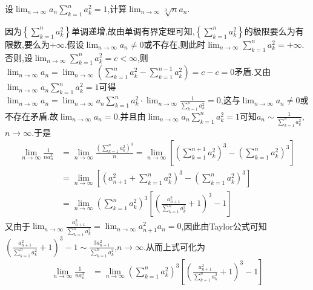 \documentclass[lang=cn,newtx,10pt,scheme=chinese]{elegantbook}
\begin{document}
\begin{example}
设\(\lim_{n \to \infty} a_n \sum\limits_{k = 1}^{n} a_{k}^{2} = 1\),计算\(\lim_{n \to \infty} \sqrt[3]{n}a_n\).
\end{example}
\begin{solution}
因为\(\left\{\sum\limits_{k = 1}^n{a_{k}^{2}}\right\}\)单调递增,故由单调有界定理可知,\(\left\{\sum\limits_{k = 1}^n{a_{k}^{2}}\right\}\)的极限要么为有限数,要么为\(+\infty\).假设\(\lim_{n\rightarrow\infty}a_n\neq 0\)或不存在,则此时\(\lim_{n\rightarrow\infty}\sum\limits_{k = 1}^n{a_{k}^{2}}=+\infty\).否则,设\(\lim_{n\rightarrow\infty}\sum\limits_{k = 1}^n{a_{k}^{2}}=c <\infty\),则\(\lim_{n\rightarrow\infty}a_n=\lim_{n\rightarrow\infty}\left(\sum\limits_{k = 1}^n{a_{k}^{2}}-\sum\limits_{k = 1}^{n - 1}{a_{k}^{2}}\right)=c - c = 0\)矛盾.又由\(\lim_{n\rightarrow\infty}a_n\sum\limits_{k = 1}^n{a_{k}^{2}}=1\)可得\(\lim_{n\rightarrow\infty}a_n=\lim_{n\rightarrow\infty}a_n\sum\limits_{k = 1}^n{a_{k}^{2}}\cdot\lim_{n\rightarrow\infty}\frac{1}{\sum\limits_{k = 1}^n{a_{k}^{2}}}=0\),这与\(\lim_{n\rightarrow\infty}a_n\neq 0\)或不存在矛盾.故\(\lim_{n\rightarrow\infty}a_n = 0\).并且由\(\lim_{n\rightarrow\infty}a_n\sum\limits_{k = 1}^n{a_{k}^{2}}=1\)可知\(a_n\sim\frac{1}{\sum\limits_{k = 1}^n{a_{k}^{2}}}\),\(n\rightarrow\infty\).于是
\begin{align*}
\lim_{n\rightarrow\infty}\frac{1}{na_{n}^{3}}&=\lim_{n\rightarrow\infty}\frac{\left(\sum\limits_{k = 1}^n{a_{k}^{2}}\right)^3}{n}=\lim_{n\rightarrow\infty}\left[\left(\sum\limits_{k = 1}^{n + 1}{a_{k}^{2}}\right)^3-\left(\sum\limits_{k = 1}^n{a_{k}^{2}}\right)^3\right]\\
&=\lim_{n\rightarrow\infty}\left[\left(a_{n + 1}^{2}+\sum\limits_{k = 1}^n{a_{k}^{2}}\right)^3-\left(\sum\limits_{k = 1}^n{a_{k}^{2}}\right)^3\right]\\
&=\lim_{n\rightarrow\infty}\left(\sum\limits_{k = 1}^n{a_{k}^{2}}\right)^3\left[\left(\frac{a_{n + 1}^{2}}{\sum\limits_{k = 1}^n{a_{k}^{2}}}+1\right)^3 - 1\right]
\end{align*}
又由于\(\lim_{n\rightarrow\infty}\frac{a_{n + 1}^{2}}{\sum\limits_{k = 1}^n{a_{k}^{2}}}=\lim_{n\rightarrow\infty}a_{n + 1}^{2}a_n = 0\),因此由Taylor公式可知\(\left(\frac{a_{n + 1}^{2}}{\sum\limits_{k = 1}^n{a_{k}^{2}}}+1\right)^3 - 1\sim\frac{3a_{n + 1}^{2}}{\sum\limits_{k = 1}^n{a_{k}^{2}}}\),\(n\rightarrow\infty\).从而上式可化为
\begin{align*}
\lim_{n\rightarrow\infty}\frac{1}{na_{n}^{3}}&=\lim_{n\rightarrow\infty}\left(\sum\limits_{k = 1}^n{a_{k}^{2}}\right)^3\left[\left(\frac{a_{n + 1}^{2}}{\sum\limits_{k = 1}^n{a_{k}^{2}}}+1\right)^3 - 1\right]\\

\end{align*}
\end{solution}
\end{document}
